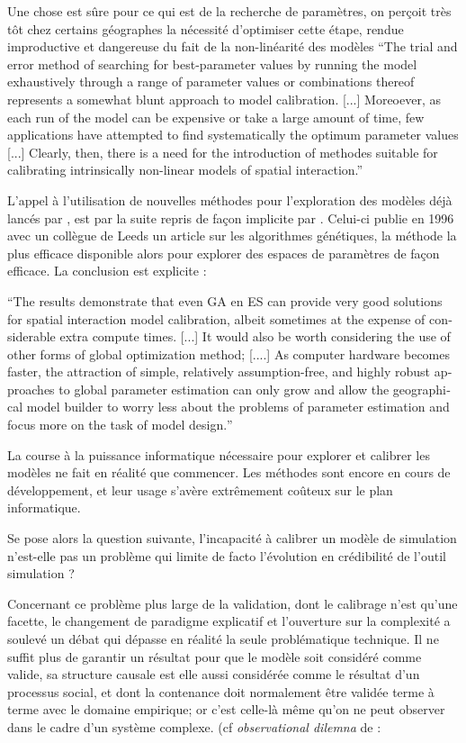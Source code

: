 Une chose est sûre pour ce qui est de la recherche de paramètres, on perçoit très tôt chez certains géographes la nécessité d'optimiser cette étape, rendue improductive et dangereuse du fait de la non-linéarité des modèles \enquote{The trial and error method of searching for best-parameter values by running the model exhaustively through a range of parameter values or combinations thereof represents a somewhat blunt approach to model calibration. [...] Moreoever, as each run of the model can be expensive or take a large amount of time, few applications have attempted to find systematically the optimum parameter values [...] Clearly, then, there is a need for the introduction of methodes suitable for calibrating intrinsically non-linear models of spatial interaction.} \autocite[155]{Batty1976}

L'appel à l'utilisation de nouvelles méthodes pour l'exploration des modèles déjà lancés par \textcite{Batty1976}, est par la suite repris de façon implicite par \textcite{Openshaw1996}. Celui-ci publie en 1996 avec un collègue de Leeds un article sur les algorithmes génétiques, la méthode la plus efficace disponible alors pour explorer des espaces de paramètres de façon efficace. La conclusion est explicite :

\foreignquote{english}{The results demonstrate that even GA en ES can provide very good solutions for spatial interaction model calibration, albeit sometimes at the expense of considerable extra compute times. [...] It would also be worth considering the use of other forms of global optimization method; [....] As computer hardware becomes faster, the attraction of simple, relatively assumption-free, and highly robust approaches to global parameter estimation can only grow and allow the geographical model builder to worry less about the problems of parameter estimation and focus more on the task of model design.}\autocite{Openshaw1996}

La course à la puissance informatique nécessaire pour explorer et calibrer les modèles ne fait en réalité que commencer. Les méthodes sont encore en cours de développement, et leur usage s'avère extrêmement coûteux sur le plan informatique.

Se pose alors la question suivante, l'incapacité à calibrer un modèle de simulation n'est-elle pas un problème qui limite de facto l'évolution en crédibilité de l'outil simulation ? 

Concernant ce problème plus large de la validation, dont le calibrage n'est qu'une facette, le changement de paradigme explicatif et l'ouverture sur la complexité a soulevé un débat qui dépasse en réalité la seule problématique technique. Il ne suffit plus de garantir un résultat pour que le modèle soit considéré comme valide, sa structure causale est elle aussi considérée comme le résultat d'un processus social, et dont la contenance doit normalement être validée terme à terme avec le domaine empirique; or c'est celle-là même qu'on ne peut observer dans le cadre d'un système complexe. (cf \textit{observational dilemna} de \textcite[296]{Batty1976} :


